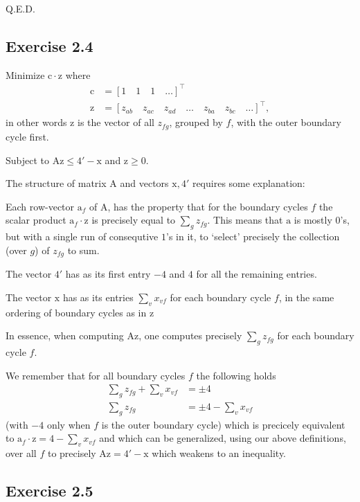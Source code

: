 Q.E.D.

\subsection{Exercise 2.4}

\newcommand\brm[1]{\bm{\mathrm{#1}}}

Minimize $\brm c \cdot \brm z$ where
\begin{align*}
  \brm c &= [1 \quad 1 \quad 1 \quad \dots ]^\intercal \\
  \brm z &= [z_{ab} \quad z_{ac} \quad z_{ad} \quad \dots \quad z_{ba} \quad z_{bc} \quad \dots ]^\intercal,
\end{align*}
in other words $\brm z$ is the vector of all $z_{fg}$, grouped by $f$, with the outer boundary cycle
first.

Subject to $\brm A \brm z \leqslant \brm{4'} - \brm x$ and $\brm z \geqslant \brm 0$.

The structure of matrix $\brm A$ and vectors $\brm x, \brm{4'}$ requires some explanation:

Each row-vector $\brm a_f$ of $\brm A$, has the property that for the boundary cycles $f$
the scalar product $\brm a_f \cdot \brm z$ is precisely equal to $\sum_g z_{fg}$. This means that
$\brm a$ is mostly $0$'s, but with a single run of consequtive $1$'s in it, to `select' precisely
the collection (over $g$) of $z_{fg}$ to sum.

The vector $\brm{4'}$ has as its first entry $ -4$ and $4$ for all the remaining entries.

The vector $\brm x$ has as its entries $\sum_v x_{vf}$ for each boundary cycle $f$, in the same
ordering of boundary cycles as in $\brm z$

In essence, when computing $\brm A \brm z$, one computes precisely  $\sum_g z_{fg}$ for each
boundary cycle $f$.

We remember that for all boundary cycles $f$ the following holds
\begin{align*}
  \sum_g z_{fg} + \sum_v x_{vf} &= \pm 4 \\
  \sum_g z_{fg} &= \pm 4 - \sum_v x_{vf}
\end{align*}
(with $-4$ only when $f$ is the outer boundary cycle)
which is precicely equivalent to $\brm a_f \cdot \brm z = 4 - \sum_v x_{vf}$
and which can be generalized, using our above definitions, over all $f$ to precisely
$\brm A \brm z = \brm{4'} - \brm x$ which weakens to an inequality.

\subsection{Exercise 2.5}

